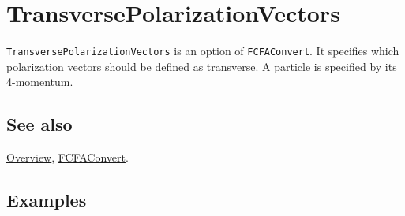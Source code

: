 \documentclass[../FeynCalcManual.tex]{subfiles}
\begin{document}
\hypertarget{transversepolarizationvectors}{%
\section{TransversePolarizationVectors}\label{transversepolarizationvectors}}

\texttt{TransversePolarizationVectors} is an option of
\texttt{FCFAConvert}. It specifies which polarization vectors should be
defined as transverse. A particle is specified by its 4-momentum.

\subsection{See also}

\hyperlink{toc}{Overview}, \hyperlink{fcfaconvert}{FCFAConvert}.

\subsection{Examples}
\end{document}
